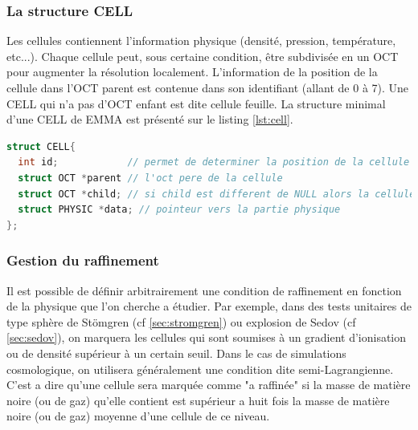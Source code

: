 \subsubsection{La structure CELL}

Les cellules contiennent l'information physique (densité, pression, température, etc...).
Chaque cellule peut, sous certaine condition, être subdivisée en un OCT pour augmenter la résolution localement.
L'information de la position de la cellule dans l'OCT parent est contenue dans son identifiant (allant de 0 à 7).
Une CELL qui n'a pas d'OCT enfant est dite cellule feuille.
La structure minimal d'une CELL de EMMA est présenté sur le listing \ref{lst:cell}.

\begin{lstlisting}[float=bth,language=C,frame=tb,caption={La structure CELL de EMMA},label=lst:cell]
struct CELL{
  int id;            // permet de determiner la position de la cellule dans l'oct
  struct OCT *parent // l'oct pere de la cellule
  struct OCT *child; // si child est different de NULL alors la cellule est raffinee et child point vers l'oct enfant
  struct PHYSIC *data; // pointeur vers la partie physique
};
\end{lstlisting}

\subsubsection{Gestion du raffinement}
\label{sec:raffinement}

Il est possible de définir arbitrairement une condition de raffinement en fonction de la physique que l'on cherche a étudier.
Par exemple, dans des tests unitaires de type sphère de Stömgren (cf \ref{sec:stromgren}) ou explosion de Sedov (cf \ref{sec:sedov}), on marquera les cellules qui sont soumises à un gradient d'ionisation ou de densité supérieur à un certain seuil.
Dans le cas de simulations cosmologique, on utilisera généralement une condition dite semi-Lagrangienne.
C'est a dire qu'une cellule sera marquée comme "a raffinée" si la masse de matière noire (ou de gaz) qu'elle contient est supérieur a huit fois la masse de matière noire (ou de gaz) moyenne d'une cellule de ce niveau.

